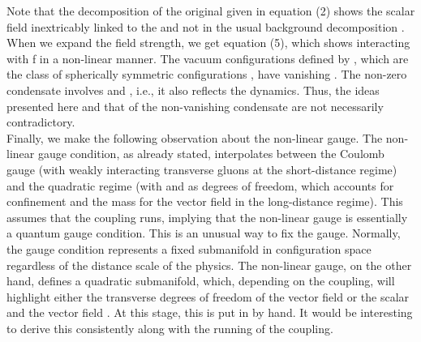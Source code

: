 \documentclass[a4paper,12pt]{article}
\begin{document}
Note that the decomposition of the original \coordHE{} given in equation (2) shows the scalar field \coordHE{} inextricably linked to the \coordHE{} and not in the usual background decomposition \coordHE{}.  When we expand the field strength, we get equation (5), which shows \coordHE{} interacting with f in a non-linear manner.  The vacuum configurations defined by \coordHE{}, which are the class of spherically symmetric configurations \coordHE{}, have vanishing \coordHE{}.  The non-zero condensate \coordHE{} involves \coordHE{} and \coordHE{}, i.e., it also reflects the \coordHE{} dynamics.  Thus, the ideas presented here and that of the non-vanishing condensate are not necessarily contradictory.\\

Finally, we make the following observation about the non-linear gauge.  The non-linear gauge condition, as already stated, interpolates between the Coulomb gauge (with weakly interacting transverse gluons at the short-distance regime) and the quadratic regime (with \coordHE{} and \coordHE{} as degrees of freedom, which accounts for confinement and the mass for the vector field in the long-distance regime).  This assumes that the coupling runs, implying that the non-linear gauge is essentially a quantum gauge condition.  This is an unusual way to fix the gauge.  Normally, the gauge condition represents a fixed submanifold in configuration space regardless of the distance scale of the physics.  The non-linear gauge, on the other hand, defines a quadratic submanifold, which, depending on the coupling, will highlight either the transverse degrees of freedom of the vector field or the scalar \coordHE{} and the vector field \coordHE{}.  At this stage, this is put in by hand.  It would be interesting to derive this consistently along with the running of the coupling.
\end{document}
